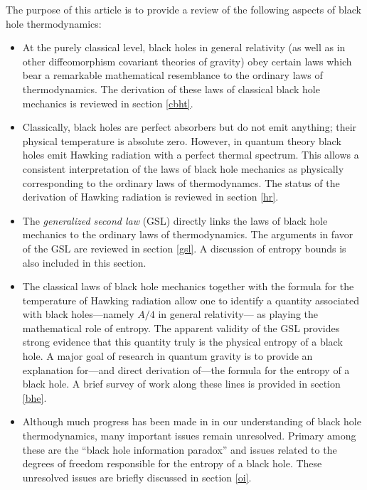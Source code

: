 The purpose of this article is to provide a review of the following
aspects of black hole thermodynamics:

\begin{itemize}
\item At the purely classical level, black holes in general relativity
(as well as in other diffeomorphism covariant theories of gravity)
obey certain laws which bear a remarkable mathematical resemblance to
the ordinary laws of thermodynamics. The derivation of these laws of
classical black hole mechanics is reviewed in section \ref{cbht}.

\item Classically, black holes are perfect absorbers but do not emit
anything; their physical temperature is absolute zero. However, in
quantum theory black holes emit Hawking radiation with a perfect
thermal spectrum. This allows a consistent interpretation of the laws of
black hole mechanics as physically corresponding to the ordinary laws
of thermodynamcs. The status of the derivation of Hawking radiation
is reviewed in section \ref{hr}.

\item The {\it generalized second law} (GSL) directly links the laws
of black hole mechanics to the ordinary laws of thermodynamics. The
arguments in favor of the GSL are reviewed in section \ref{gsl}. A
discussion of entropy bounds is also included in this section.

\item The classical laws of black hole mechanics together with the
formula for the temperature of Hawking radiation allow one to identify
a quantity associated with black holes---namely $A/4$ in general
relativity--- as playing the mathematical role of entropy. The apparent
validity of the GSL provides strong evidence that this quantity truly
is the physical entropy of a black hole. A major goal of research in
quantum gravity is to provide an explanation for---and direct
derivation of---the formula for the entropy of a black hole. A brief
survey of work along these lines is provided in section \ref{bhe}.

\item Although much progress has been made in in our understanding of
black hole thermodynamics, many important issues remain
unresolved. Primary among these are the ``black hole information
paradox'' and issues related to the degrees of freedom responsible for
the entropy of a black hole. These unresolved issues are
briefly discussed in section \ref{oi}.

\end{itemize}

